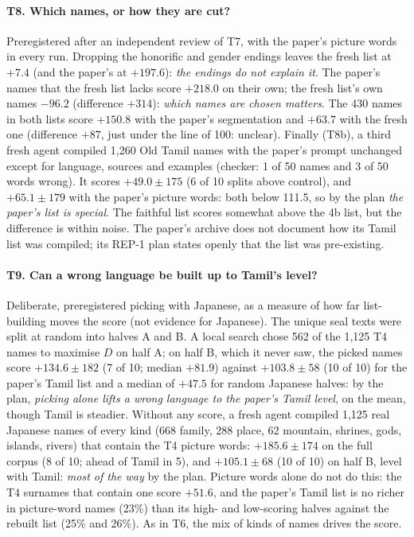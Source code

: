 \documentclass[11pt,a4paper]{article}
\begin{document}
\paragraph{T8. Which names, or how they are cut?} Preregistered after an independent review of T7, with the paper's picture words in every run. Dropping the honorific and gender endings leaves the fresh list at $+7.4$ (and the paper's at $+197.6$): \emph{the endings do not explain it}. The paper's names that the fresh list lacks score $+218.0$ on their own; the fresh list's own names $-96.2$ (difference $+314$): \emph{which names are chosen matters}. The 430 names in both lists score $+150.8$ with the paper's segmentation and $+63.7$ with the fresh one (difference $+87$, just under the line of 100: unclear). Finally (T8b), a third fresh agent compiled 1,260 Old Tamil names with the paper's prompt unchanged except for language, sources and examples (checker: 1 of 50 names and 3 of 50 words wrong). It scores $+49.0\pm175$ (6 of 10 splits above control), and $+65.1\pm179$ with the paper's picture words: both below 111.5, so by the plan \emph{the paper's list is special}. The faithful list scores somewhat above the 4b list, but the difference is within noise. The paper's archive does not document how its Tamil list was compiled; its REP-1 plan states openly that the list was pre-existing.

\paragraph{T9. Can a wrong language be built up to Tamil's level?} Deliberate, preregistered picking with Japanese, as a measure of how far list-building moves the score (not evidence for Japanese). The unique seal texts were split at random into halves A and B. A local search chose 562 of the 1,125 T4 names to maximise $D$ on half A; on half B, which it never saw, the picked names score $+134.6\pm182$ (7 of 10; median $+81.9$) against $+103.8\pm58$ (10 of 10) for the paper's Tamil list and a median of $+47.5$ for random Japanese halves: by the plan, \emph{picking alone lifts a wrong language to the paper's Tamil level}, on the mean, though Tamil is steadier. Without any score, a fresh agent compiled 1,125 real Japanese names of every kind (668 family, 288 place, 62 mountain, shrines, gods, islands, rivers) that contain the T4 picture words: $+185.6\pm174$ on the full corpus (8 of 10; ahead of Tamil in 5), and $+105.1\pm68$ (10 of 10) on half B, level with Tamil: \emph{most of the way} by the plan. Picture words alone do not do this: the T4 surnames that contain one score $+51.6$, and the paper's Tamil list is no richer in picture-word names (23\%) than its high- and low-scoring halves against the rebuilt list (25\% and 26\%). As in T6, the mix of kinds of names drives the score.
\end{document}
